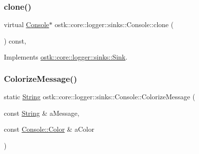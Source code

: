 \subsubsection{\texorpdfstring{clone()}{clone()}}
{\footnotesize\ttfamily virtual \hyperlink{classostk_1_1core_1_1logger_1_1sinks_1_1_console}{Console}$\ast$ ostk\+::core\+::logger\+::sinks\+::\+Console\+::clone (\begin{DoxyParamCaption}{ }\end{DoxyParamCaption}) const\hspace{0.3cm}{\ttfamily [override]}, {\ttfamily [virtual]}}



Implements \hyperlink{classostk_1_1core_1_1logger_1_1sinks_1_1_sink_a0e6b41f9b4626b5229370f71bd27be32}{ostk\+::core\+::logger\+::sinks\+::\+Sink}.

\mbox{\label{classostk_1_1core_1_1logger_1_1sinks_1_1_console_a135245244645e842ba7388445d03b16d}} 
\subsubsection{\texorpdfstring{Colorize\+Message()}{ColorizeMessage()}}
{\footnotesize\ttfamily static \hyperlink{classostk_1_1core_1_1types_1_1_string}{String} ostk\+::core\+::logger\+::sinks\+::\+Console\+::\+Colorize\+Message (\begin{DoxyParamCaption}\item[{const \hyperlink{classostk_1_1core_1_1types_1_1_string}{String} \&}]{a\+Message,  }\item[{const \hyperlink{classostk_1_1core_1_1logger_1_1sinks_1_1_console_abfacace5be69257cad68f802040c050b}{Console\+::\+Color} \&}]{a\+Color }\end{DoxyParamCaption})\hspace{0.3cm}{\ttfamily [static]}}

\mbox{\label{classostk_1_1core_1_1logger_1_1sinks_1_1_console_a5872f5826955ff7f6371bce6ea320253}} 
